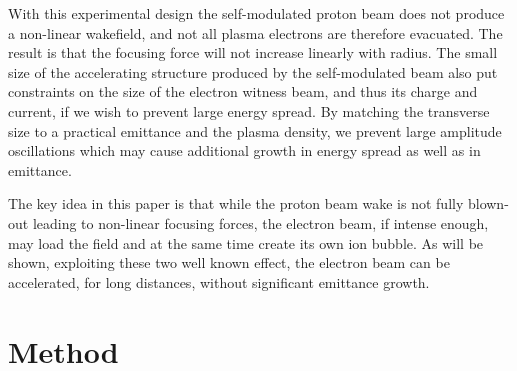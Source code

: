 \documentclass[aps,prstab,reprint,amsmath,amssymb,groupedaddress]{revtex4-1}
\newcommand{\unit}[1]{\,\mathrm{#1}}
\begin{document}
With this experimental design the self-modulated proton beam does not produce a non-linear wakefield, and not all plasma
electrons are therefore evacuated. The result is that the focusing force will not increase linearly with radius. The
small size of the accelerating structure produced by the self-modulated beam also put constraints on the size of the
electron witness beam, and thus its charge and current, if we wish to prevent large energy spread. By matching the
transverse size to a practical emittance and the plasma density, we prevent large amplitude oscillations which may cause
additional growth in energy spread as well as in emittance.

The key idea in this paper is that while the proton beam wake is not fully blown-out leading to non-linear focusing
forces, the electron beam, if intense enough, may load the field and at the same time create its own ion bubble. As will
be shown, exploiting these two well known effect, the electron beam can be accelerated, for long distances, without
significant emittance growth.


\section[\label{S:M}]{Method}
\end{document}

